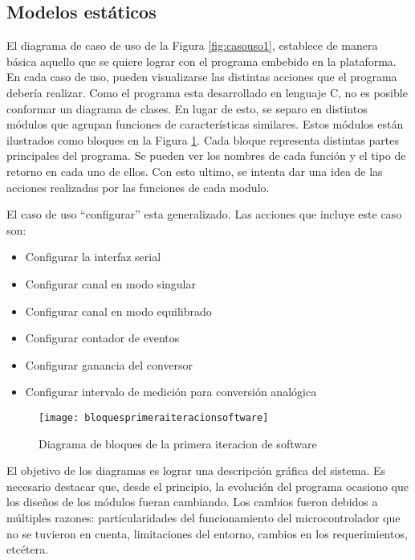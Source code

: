 \subsection{Modelos estáticos} %
\label{it2:sub:modelos_estaticos}

El diagrama de caso de uso de la Figura \ref{fig:casouso1}, establece de manera básica aquello que se quiere lograr con el programa embebido en la plataforma. En cada caso de uso, pueden visualizarse las distintas acciones que el programa debería realizar. Como el programa esta desarrollado en lenguaje C, no es posible conformar un diagrama de clases. En lugar de esto, se separo en distintos módulos que agrupan funciones de características similares. Estos módulos están ilustrados como bloques en la Figura \ref{it2:fig:bloquesprimeraiteracionsoftware}. Cada bloque representa distintas partes principales del programa. Se pueden ver los nombres de cada función y el tipo de retorno en cada uno de ellos. Con esto ultimo, se intenta dar una idea de las acciones realizadas por las funciones de cada modulo. %

El caso de uso ``configurar'' esta generalizado. Las acciones que incluye este caso son:
\begin{itemize}
  \item Configurar la interfaz serial
  \item Configurar canal en modo singular
  \item Configurar canal en modo equilibrado
  \item Configurar contador de eventos
  \item Configurar ganancia del conversor
  \item Configurar intervalo de medición para conversión analógica
\end{itemize}


\begin{figure}[h]
  \centering
  \texttt{[image: bloquesprimeraiteracionsoftware]}
  \caption{Diagrama de bloques de la primera iteracion de software}\label{it2:fig:bloquesprimeraiteracionsoftware}
\end{figure}

El objetivo de los diagramas es lograr una descripción gráfica del sistema. Es necesario destacar que, desde el principio, la evolución del programa ocasiono que los diseños de los módulos fueran cambiando. Los cambios fueron debidos a múltiples razones: particularidades del funcionamiento del microcontrolador que no se tuvieron en cuenta, limitaciones del entorno, cambios en los requerimientos, etcétera. 

